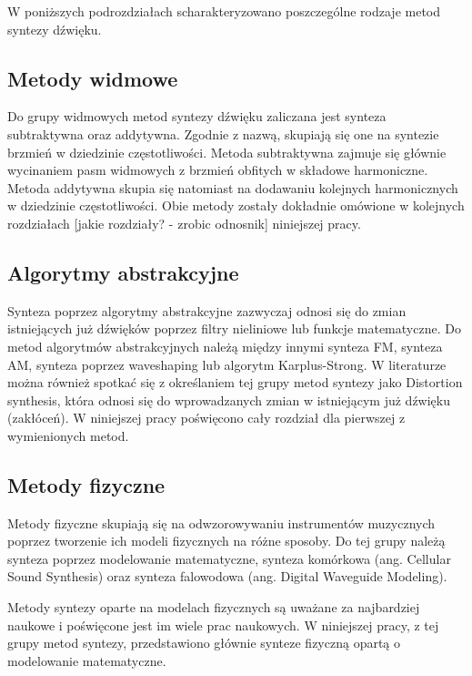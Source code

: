 W poniższych podrozdziałach scharakteryzowano poszczególne rodzaje metod syntezy dźwięku.

\subsection{Metody widmowe}
Do grupy widmowych metod syntezy dźwięku zaliczana jest synteza subtraktywna oraz addytywna. Zgodnie z nazwą, skupiają się one na syntezie brzmień w dziedzinie częstotliwości. Metoda subtraktywna zajmuje się głównie wycinaniem pasm widmowych z brzmień obfitych w składowe harmoniczne. Metoda addytywna skupia się natomiast na dodawaniu kolejnych harmonicznych w dziedzinie częstotliwości. Obie metody zostały dokładnie omówione w kolejnych rozdziałach [jakie rozdziały? - zrobic odnosnik] niniejszej pracy.

\subsection{Algorytmy abstrakcyjne}
Synteza poprzez algorytmy abstrakcyjne zazwyczaj odnosi się do zmian istniejących już dźwięków poprzez filtry nieliniowe lub funkcje matematyczne. Do metod algorytmów abstrakcyjnych należą między innymi synteza FM, synteza AM, synteza poprzez waveshaping lub algorytm Karplus-Strong. W literaturze można również spotkać się z określaniem tej grupy metod syntezy jako Distortion synthesis, która odnosi się do wprowadzanych zmian w istniejącym już dźwięku (zakłóceń). W niniejszej pracy poświęcono cały rozdział dla pierwszej z wymienionych metod.

\subsection{Metody fizyczne}
Metody fizyczne skupiają się na odwzorowywaniu instrumentów muzycznych poprzez tworzenie ich modeli fizycznych na różne sposoby. Do tej grupy należą synteza poprzez modelowanie matematyczne, synteza komórkowa (ang. Cellular Sound Synthesis) oraz synteza falowodowa (ang. Digital Waveguide Modeling).

Metody syntezy oparte na modelach fizycznych są uważane za najbardziej naukowe i poświęcone jest im wiele prac naukowych. W niniejszej pracy, z tej grupy metod syntezy, przedstawiono głównie synteze fizyczną opartą o modelowanie matematyczne.

